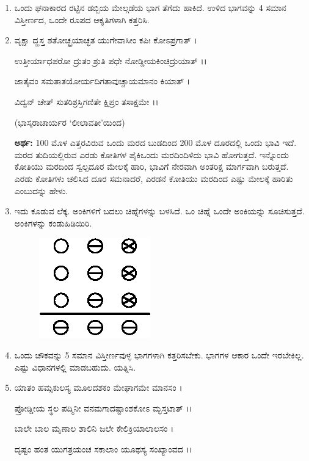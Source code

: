\begin{enumerate}
\item ಒಂದು ಘನಾಕಾರದ ರಟ್ಟಿನ ಡಬ್ಬಿಯ ಮೇಲ್ಗಡೆಯ ಭಾಗ ತೆಗೆದು ಹಾಕಿದೆ. ಉಳಿದ ಭಾಗವನ್ನು 4 ಸಮಾನ ವಿಸ್ತೀರ್ಣದ, ಒಂದೇ ರೂಪದ ಆಕೃತಿಗಳಾಗಿ ಕತ್ತರಿಸಿ. 

\item ವೃಕ್ಷಾ ದ್ಹಸ್ತ ಶತೋಚ್ಛ್ರಯಾಚ್ಛತ ಯುಗೇವಾಸೀಂ ಕಪಿಃ ಕೋಽಪ್ರಗಾತ್ ।

ಉತ್ತೀರ್ಯಾಧಪರೋ ದ್ರುತಂ ಶ್ರುತಿ ಪಧೇ ನೋಡ್ಡೀಯಕಿಂಚಿದ್ರುಯಾತ್ ।।

ಜಾತೈವಂ ಸಮತಾತಯೋರ್ಯದಿಗತಾವುಚ್ಚಾಯಮಾನಂ ಕಿಯಾತ್ ।

ವಿದ್ವನ್ ಚೇತ್ ಸುತರಿಶ್ರಸ್ತಿಗಣಿತೇ ಕ್ಷಿಪ್ರಂ ತಸಾಕ್ಷಮೇ ।।

\smallskip

\hfill (ಭಾಸ್ಕರಾಚಾರ್ಯರ `ಲೀಲಾವತೀ'ಯಿಂದ)

\smallskip

{\bf ಅರ್ಥ:}  100 ಮೊಳ ಎತ್ತರವಿರುವ ಒಂದು ಮರದ ಬುಡದಿಂದ 200  ಮೊಳ ದೂರದಲ್ಲಿ ಒಂದು ಭಾವಿ ಇದೆ. ಮರದ ತುದಿಯಲ್ಲಿರುವ ಎರಡು ಕೋತಿಗಳ ಪೈಕಿ\break ಒಂದು ಮರದಿಂದಿಳಿದು ಭಾವಿ ಹೋಗುತ್ತದೆ. ಇನ್ನೊಂದು ಕೋತಿಯು ಮರದಿಂದ ಸ್ವಲ್ಪದೂರ ಮೇಲಕ್ಕೆ ಹಾರಿ, ಭಾವಿಗೆ ನೇರವಾಗಿ ಅಂತರಿಕ್ಷ ಮಾರ್ಗವಾಗಿ ಬರುತ್ತದೆ. ಎರಡು ಕೋತಿಗಳು ಚಲಿಸಿದ ದೂರ ಸಮನಾದರೆ, ಎರಡನೆ ಕೋತಿಯು ಮರದಿಂದ ಎಷ್ಟು ಮೇಲಕ್ಕೆ ಹಾರಿತು ಎಂಬುದನ್ನು ಹೇಳು. 

\item ಇದು ಕೂಡುವ ಲೆಕ್ಕ. ಅಂಕಿಗಳಿಗೆ ಬದಲು ಚಿಹ್ನೆಗಳನ್ನು ಬಳಸಿದೆ. ಒಂ ಚಿಹ್ನೆ ಒಂದೇ ಅಂಕಿಯನ್ನು ಸೂಚಿಸುತ್ತದೆ. ಅಂಕಿಗಳನ್ನು ಕಂಡುಹಿಡಿಯಿರಿ. 
\begin{figure}[H]
\centering
\includegraphics{images/chap12/q24.eps}
\end{figure}


\item ಒಂದು ಚೌಕವನ್ನು 5 ಸಮಾನ ವಿಸ್ತೀರ್ಣವುಳ್ಳ ಭಾಗಗಳಾಗಿ ಕತ್ತರಿಸಬೇಕು. ಭಾಗಗಳ ಆಕಾರ ಒಂದೇ ಇರಬೇಕಿಲ್ಲ. ಎಷ್ಟು ವಿಧಾನಗಳಲ್ಲಿ ಮಾಡಬಹುದು. ಯತ್ನಿಸಿ.  

\item ಯಾತಂ ಹಮ್ಸಕುಲಸ್ಯ ಮೂಲದಶಕಂ ಮೇಘಾಗಮೇ ಮಾನಸಂ ।

ಪ್ರೋಡ್ಡೀಯ ಸ್ಥಲ ಪದ್ಮಿನೀ ವನಮಗಾದಷ್ಟಾಂಶಕೋಽ ಮ್ಭಸ್ತಟಾತ್ ।।

ಬಾಲೇ ಬಾಲ ಮೃಣಾಲ ಶಾಲಿನಿ ಜಲೇ ಕೇಲಿಕ್ರಿಯಾಲಾಲಸಂ ।

ದೃಷ್ಟಂ ಹಂತ ಯುಗತ್ರಯಂಚ ಸಕಾಲಾಂ ಯೂಥಸ್ಯ ಸಂಖ್ಯಾಂವದ ।।


\end{enumerate}
